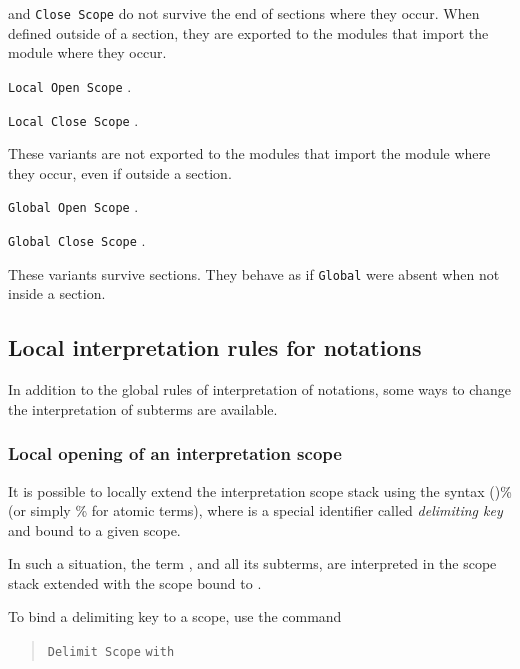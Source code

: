  and {\tt Close Scope} do not survive the end of
sections where they occur. When defined outside of a section, they are
exported to the modules that import the module where they occur.

\begin{Variants}

\item {\tt Local Open Scope} {\scope}.

\item {\tt Local Close Scope} {\scope}.

These variants are not exported to the modules that import the module
where they occur, even if outside a section.

\item {\tt Global Open Scope} {\scope}.

\item {\tt Global Close Scope} {\scope}.

These variants survive sections. They behave as if {\tt Global} were
absent when not inside a section.

\end{Variants}

\subsection{Local interpretation rules for notations}

In addition to the global rules of interpretation of notations, some
ways to change the interpretation of subterms are available.

\subsubsection{Local opening of an interpretation scope 
\label{scopechange}
\index{\%}
}

It is possible to locally extend the interpretation scope stack using
the syntax ({\term})\%{\delimkey} (or simply {\term}\%{\delimkey}
for atomic terms), where {\delimkey} is a special identifier called
{\em delimiting key} and bound to a given scope.

In such a situation, the term {\term}, and all its subterms, are
interpreted in the scope stack extended with the scope bound to
{\delimkey}.

To bind a delimiting key to a scope, use the command

\begin{quote}
\texttt{Delimit Scope} {\scope} \texttt{with} {\ident} 
\end{quote}

